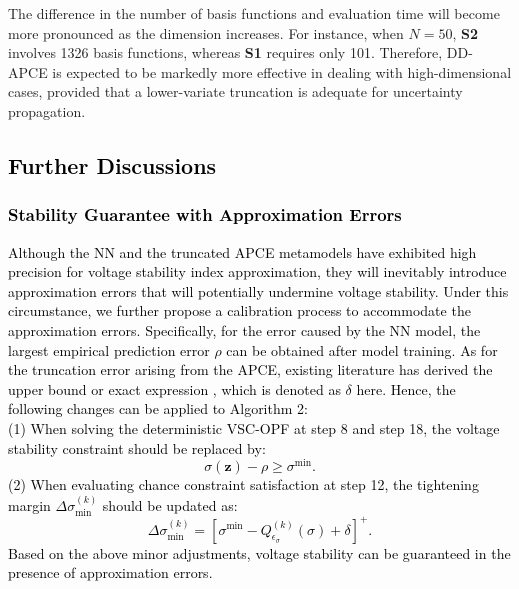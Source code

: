 \documentclass[journal]{IEEEtran}
\theoremstyle{definition}
\theoremstyle{remark}
\begin{document}
The difference in the number of basis functions and evaluation time will become more pronounced as the dimension increases. For instance, when $N=50$, \textbf{S2} involves 1326 basis functions, whereas \textbf{S1} requires only 101.
Therefore, DD-APCE is expected to be markedly more effective in dealing with high-dimensional cases, provided that a lower-variate truncation is adequate for uncertainty propagation.
\subsection{\textcolor{black}{Further Discussions}}
\subsubsection{\textcolor{black}{Stability Guarantee with Approximation Errors}}
\textcolor{black}{
    Although the NN and the truncated APCE metamodels have exhibited high precision for voltage stability index approximation, they will inevitably introduce approximation errors that will potentially undermine voltage stability. Under this circumstance, we further propose a calibration process to accommodate the approximation errors. Specifically, for the error caused by the NN model, the largest empirical prediction error $\rho$ can be obtained after model training. As for the truncation error arising from the APCE, existing literature has derived the upper bound or exact expression \cite{fag2011on,mu2018comment}, which is denoted as $\delta$ here. Hence, the following changes can be applied to Algorithm 2:\\     
    (1) When solving the deterministic VSC-OPF at step 8 and step 18, the voltage stability constraint should be replaced by:
    \begin{equation}
            \sigma(\boldsymbol{z})-\rho\geq\sigma^{\min}.
    \end{equation}
    (2) When evaluating chance constraint satisfaction at step 12, the tightening margin $\Delta \sigma_{\min}^{(k)}$ should be updated as:
    \begin{equation}
        \Delta \sigma_{\min}^{(k)}=\left[\sigma^{\min}-Q_{\epsilon_{\sigma}}^{(k)}\left(\sigma\right)+\delta\right]^+.
    \end{equation}
    Based on the above minor adjustments, voltage stability can be guaranteed in the presence of approximation errors.}
\end{document}
